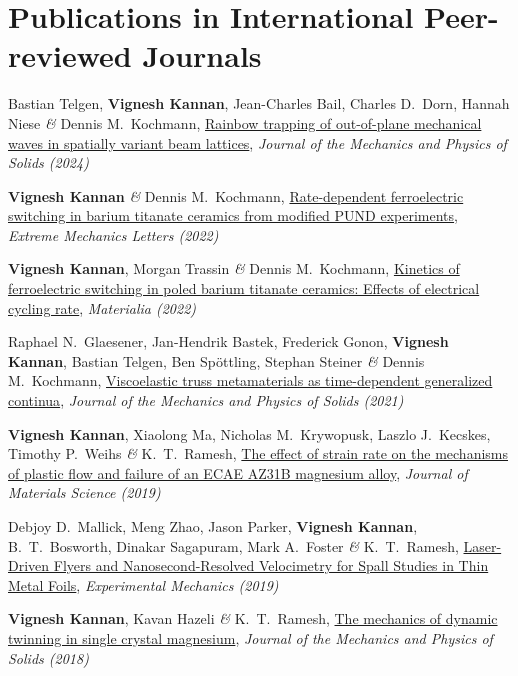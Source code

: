 \documentclass[a4paper,10pt, oneside]{article}
\begin{document}
	\section*{{Publications in International Peer-reviewed Journals}}
	\begin{enumerate}[label={[\arabic*]}, leftmargin=*]
		\item Bastian Telgen, \textbf{Vignesh Kannan}, Jean-Charles Bail, Charles D.~Dorn, Hannah Niese \emph{\&} Dennis M.~Kochmann, \href{https://doi.org/10.1016/j.jmps.2024.105762}{Rainbow trapping of out-of-plane mechanical waves in spatially variant beam lattices}, \textit{Journal of the Mechanics and Physics of Solids (2024)} \label{jmps2024}
		\item \textbf{Vignesh Kannan} \emph{\&} Dennis M.~Kochmann, \href{https://doi.org/10.1016/j.eml.2022.101898}{Rate-dependent ferroelectric switching in barium titanate ceramics from modified PUND experiments}, \textit{Extreme Mechanics Letters (2022)} \label{eml2022}
		\item \textbf{Vignesh Kannan}, Morgan Trassin  \emph{\&} Dennis M.~Kochmann, \href{https://doi.org/10.1016/j.mtla.2022.101553}{Kinetics of ferroelectric switching in poled barium titanate ceramics: Effects of electrical cycling rate}, \textit{Materialia (2022)} \label{mat2022}
		\item Raphael N.~Glaesener, Jan-Hendrik Bastek, Frederick Gonon, \textbf{Vignesh Kannan}, Bastian Telgen, Ben Sp\"{o}ttling, Stephan Steiner \emph{\&} Dennis M.~Kochmann, \href{https://www.sciencedirect.com/science/article/pii/S0022509621002180}{Viscoelastic truss metamaterials as time-dependent generalized continua}, \textit{Journal of the Mechanics and Physics of Solids (2021)} \label{jmps2021}
		\item \textbf{Vignesh Kannan}, Xiaolong Ma, Nicholas M.~Krywopusk, Laszlo J.~Kecskes, Timothy P.~Weihs \emph{\&} K.~T.~Ramesh, \href{https://link.springer.com/article/10.1007/s10853-019-03838-5}{The effect of strain rate on the mechanisms of plastic flow and failure of an ECAE AZ31B magnesium alloy}, \textit{Journal of Materials Science (2019)} \label{jms2019}
		\item Debjoy D.~Mallick, Meng Zhao, Jason Parker, \textbf{Vignesh Kannan}, B.~T.~Bosworth, Dinakar Sagapuram, Mark A.~Foster \emph{\&} K.~T.~Ramesh, \href{https://link.springer.com/article/10.1007/s11340-019-00519-x}{Laser-Driven Flyers and Nanosecond-Resolved Velocimetry for Spall Studies in Thin Metal Foils}, \textit{Experimental Mechanics (2019)} \label{em2019}
		\item \textbf{Vignesh Kannan}, Kavan Hazeli \emph{\&} K.~T.~Ramesh, \href{https://www.sciencedirect.com/science/article/pii/S0022509617309201}{The mechanics of dynamic twinning in single crystal magnesium}, \textit{Journal of the Mechanics and Physics of Solids (2018)} \label{jmps2018}

\end{enumerate}
\end{document}
